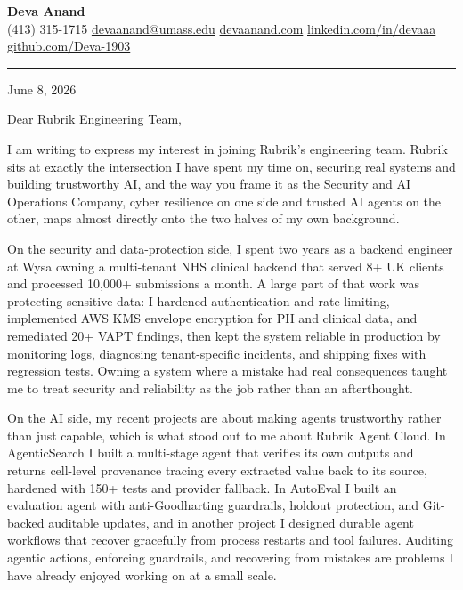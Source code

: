 \documentclass[letterpaper,11pt]{article}
\begin{document}
\pagestyle{empty}
\begin{center}
    {\LARGE \bfseries \textcolor{ResumeNavy}{Deva Anand}} \\ \vspace{4pt}
    \small
    (413) 315-1715 \enspace\textbar\enspace
    \href{mailto:devaanand@umass.edu}{devaanand@umass.edu} \enspace\textbar\enspace
    \href{https://devaanand.com}{devaanand.com} \enspace\textbar\enspace
    \href{https://linkedin.com/in/devaaa/}{linkedin.com/in/devaaa} \enspace\textbar\enspace
    \href{https://github.com/Deva-1903}{github.com/Deva-1903}
\end{center}
\vspace{6pt}

\textcolor{ResumeNavy}{\rule{\textwidth}{0.8pt}}

\vspace{4pt}

June 8, 2026

Dear Rubrik Engineering Team,

I am writing to express my interest in joining Rubrik's engineering team. Rubrik sits at exactly the intersection I have spent my time on, securing real systems and building trustworthy AI, and the way you frame it as the Security and AI Operations Company, cyber resilience on one side and trusted AI agents on the other, maps almost directly onto the two halves of my own background.

On the security and data-protection side, I spent two years as a backend engineer at Wysa owning a multi-tenant NHS clinical backend that served 8+ UK clients and processed 10,000+ submissions a month. A large part of that work was protecting sensitive data: I hardened authentication and rate limiting, implemented AWS KMS envelope encryption for PII and clinical data, and remediated 20+ VAPT findings, then kept the system reliable in production by monitoring logs, diagnosing tenant-specific incidents, and shipping fixes with regression tests. Owning a system where a mistake had real consequences taught me to treat security and reliability as the job rather than an afterthought.

On the AI side, my recent projects are about making agents trustworthy rather than just capable, which is what stood out to me about Rubrik Agent Cloud. In AgenticSearch I built a multi-stage agent that verifies its own outputs and returns cell-level provenance tracing every extracted value back to its source, hardened with 150+ tests and provider fallback. In AutoEval I built an evaluation agent with anti-Goodharting guardrails, holdout protection, and Git-backed auditable updates, and in another project I designed durable agent workflows that recover gracefully from process restarts and tool failures. Auditing agentic actions, enforcing guardrails, and recovering from mistakes are problems I have already enjoyed working on at a small scale.
\end{document}

